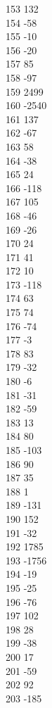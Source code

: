 { 153	132 \\
 154	-58 \\
 155	-10 \\
 156	-20 \\
 157	85 \\
 158	-97 \\
 159	2499 \\
 160	-2540 \\
 161	137 \\
 162	-67 \\
 163	58 \\
 164	-38 \\
 165	24 \\
 166	-118 \\
 167	105 \\
 168	-46 \\
 169	-26 \\
 170	24 \\
 171	41 \\
 172	10 \\
 173	-118 \\
 174	63 \\
 175	74 \\
 176	-74 \\
 177	-3 \\
 178	83 \\
 179	-32 \\
 180	-6 \\
 181	-31 \\
 182	-59 \\
 183	13 \\
 184	80 \\
 185	-103 \\
 186	90 \\
 187	35 \\
 188	1 \\
 189	-131 \\
 190	152 \\
 191	-32 \\
 192	1785 \\
 193	-1756 \\
 194	-19 \\
 195	-25 \\
 196	-76 \\
 197	102 \\
 198	28 \\
 199	-38 \\
 200	17 \\
 201	-59 \\
 202	92 \\
 203	-185 \\
}
